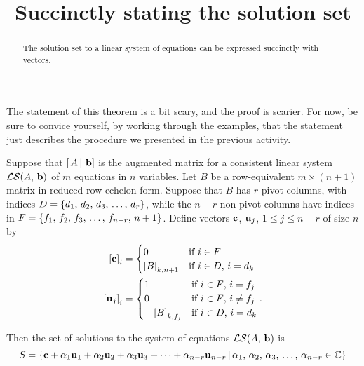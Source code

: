 \documentclass{ximera}
\title{Succinctly stating the solution set}
\begin{document}
\begin{abstract}
  The solution set to a linear system of equations can be expressed succinctly with vectors.
\end{abstract}
\maketitle

The statement of this theorem is a bit scary, and the proof is
scarier.  For now, be sure to convice yourself, by working through the
examples, that the statement just describes the procedure we presented
in the previous activity.

\begin{theorem}
  \label{theorem:VFSLS}
  Suppose that $\left\lbrack\left.A\,\right\rvert\,\mathbf{b}\right\rbrack$ is the augmented matrix for a
  consistent linear system $\mathcal{LS}\!\left(A,\,\mathbf{b}\right)$ of $m$
  equations in $n$ variables.  Let $B$ be a row-equivalent
  $m\times (n+1)$ matrix in reduced row-echelon form. Suppose that $B$
  has $r$ pivot columns, with indices
  $D=\left\{d_1,\,d_2,\,d_3,\,\ldots,\,d_r\right\}$, while the $n-r$ non-pivot
  columns have indices in
  $F=\left\{f_1,\,f_2,\,f_3,\,\ldots,\,f_{n-r},\,n+1\right\}$.  Define vectors
  $\mathbf{c}$, $\mathbf{u}_j$, $1\leq j\leq n-r$ of size $n$ by
  \begin{align*}
    \left\lbrack\mathbf{c}\right\rbrack_{i}&=
                               \begin{cases}
                                 0&\text{if $i\in F$}\\
                                 \left\lbrack B\right\rbrack_{k,n+1}&\text{if $i\in D$, $i=d_k$}
                               \end{cases}\\
    \left\lbrack\mathbf{u}_j\right\rbrack_{i}&=
                                 \begin{cases}
                                   1&\text{if $i\in F$, $i=f_j$}\\
                                   0&\text{if $i\in F$, $i\neq f_j$}\\
                                   -\left\lbrack B\right\rbrack_{k,f_j}&\text{if $i\in D$, $i=d_k$}
                                 \end{cases}.
  \end{align*}
  
  Then the set of solutions to the system of equations $\mathcal{LS}\!\left(A,\,\mathbf{b}\right)$ is
  \[
    S=\left\lbrace
      \mathbf{c}+\alpha_1\mathbf{u}_1+\alpha_2\mathbf{u}_2+\alpha_3\mathbf{u}_3+\cdots+\alpha_{n-r}\mathbf{u}_{n-r}
    \,\middle|\,
      \alpha_1,\,\alpha_2,\,\alpha_3,\,\ldots,\,\alpha_{n-r}\in\mathbb{C}
    \right\rbrace
  \]
  

\end{theorem}
\end{document}
